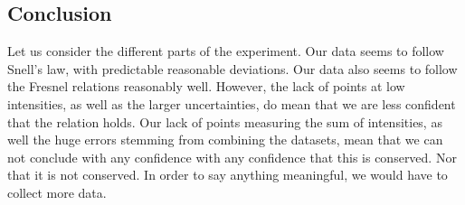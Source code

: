 \documentclass[working]{inputs/tuftebook}
\begin{document}
\subsection*{Conclusion}
Let us consider the different parts of the experiment. Our data seems to follow Snell's law, with predictable reasonable deviations. Our data also seems to follow the Fresnel relations reasonably well. However, the lack of points at low intensities, as well as the larger uncertainties, do mean that we are less confident that the relation holds. Our lack of points measuring the sum of intensities, as well the huge errors stemming from combining the datasets, mean that we can not conclude with any confidence with any confidence that this is conserved. Nor that it is not conserved. In order to say anything meaningful, we would have to collect more data.
\printbibliography
\end{document}
